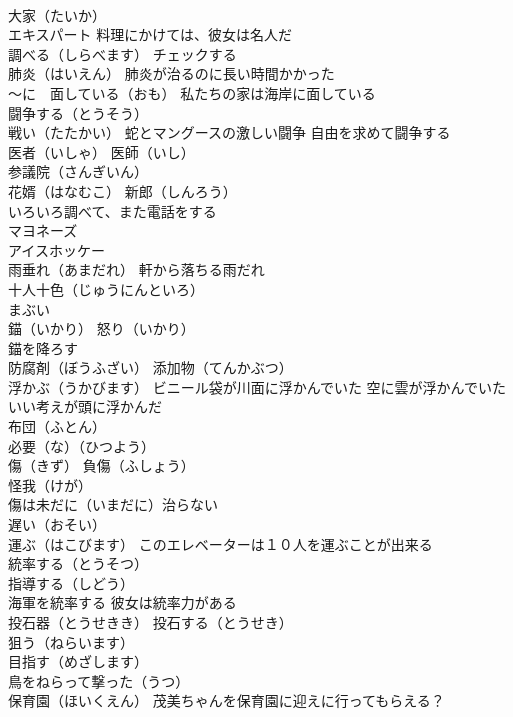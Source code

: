 \documentclass[8pt]{extreport}
\begin{document}
\begin{CJK}{UTF8}{min}
\\	大家（たいか）
\\	エキスパート 料理にかけては、彼女は名人だ
\\	調べる（しらべます） チェックする
\\	肺炎（はいえん） 肺炎が治るのに長い時間かかった
\\	～に　面している（おも） 私たちの家は海岸に面している
\\	闘争する（とうそう）
\\	戦い（たたかい） 蛇とマングースの激しい闘争 自由を求めて闘争する
\\	医者（いしゃ） 医師（いし）
\\	参議院（さんぎいん）
\\	花婿（はなむこ） 新郎（しんろう）
\\	いろいろ調べて、また電話をする
\\	マヨネーズ
\\	アイスホッケー
\\	雨垂れ（あまだれ） 軒から落ちる雨だれ
\\	十人十色（じゅうにんといろ）
\\	まぶい
\\	錨（いかり） 怒り（いかり） 
\\	錨を降ろす
\\	防腐剤（ぼうふざい） 添加物（てんかぶつ）
\\	浮かぶ（うかびます） ビニール袋が川面に浮かんでいた 空に雲が浮かんでいた いい考えが頭に浮かんだ
\\	布団（ふとん）
\\	必要（な）（ひつよう）
\\	傷（きず） 負傷（ふしょう）
\\	怪我（けが）
\\	傷は未だに（いまだに）治らない
\\	遅い（おそい）
\\	運ぶ（はこびます） このエレベーターは１０人を運ぶことが出来る
\\	統率する（とうそつ）
\\	指導する（しどう）
\\	海軍を統率する 彼女は統率力がある
\\	投石器（とうせきき） 投石する（とうせき）
\\	狙う（ねらいます） 
\\	目指す（めざします）
\\	鳥をねらって撃った（うつ）
\\	保育園（ほいくえん） 茂美ちゃんを保育園に迎えに行ってもらえる？

\end{CJK}
\end{document}
